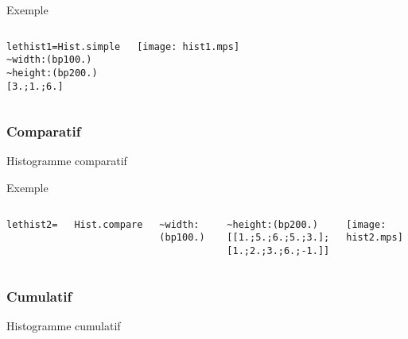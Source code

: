 \documentclass{beamer}
\begin{document}
\begin{frame}{Exemple}
  \begin{columns}
    \begin{alltt}
      let hist1 = Hist.simple
      \textasciitilde width:(bp 100.)
      \textasciitilde height:(bp 200.)
      [3.;1.;6.]
    \end{alltt}
    \begin{center}
      \texttt{[image: hist1.mps]}
    \end{center}
  \end{columns}
    
\end{frame}

\subsubsection{Comparatif}
\begin{frame}{Histogramme comparatif}
\end{frame}

\begin{frame}{Exemple}
  \begin{columns}
    \begin{alltt}
      let hist2 = 

      Hist.compare
      
      \textasciitilde width:(bp 100.)
      
      \textasciitilde height:(bp 200.)
      [[1.;5.;6.;5.;3.];
      [1.;2.;3.;6.;-1.]]
    \end{alltt}
    \begin{center}
      \texttt{[image: hist2.mps]}
    \end{center}
  \end{columns}
\end{frame}

\subsubsection{Cumulatif}
\begin{frame}{Histogramme cumulatif}
\end{frame}
\end{document}
